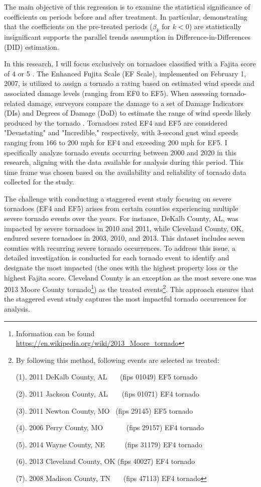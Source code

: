 \documentclass[letterpaper]{article}
\begin{document}
The main objective of this regression is to examine the statistical significance of coefficients on periods before and after treatment. In particular, demonstrating that the coefficients on the pre-treated periods (\( \beta_k \) for \( k < 0 \)) are statistically insignificant supports the parallel trends assumption in Difference-in-Differences (DID) estimation.

In this research, I will focus exclusively on tornadoes classified with a Fajita score of 4 or 5 \parencite{gallagher2023weathering}. The Enhanced Fujita Scale (EF Scale), implemented on February 1, 2007, is utilized to assign a tornado a rating based on estimated wind speeds and associated damage levels (ranging from EF0 to EF5). When assessing tornado-related damage, surveyors compare the damage to a set of Damage Indicators (DIs) and Degrees of Damage (DoD) to estimate the range of wind speeds likely produced by the tornado \parencite[]{NWS}. Tornadoes rated EF4 and EF5 are considered "Devastating" and "Incredible," respectively, with 3-second gust wind speeds ranging from 166 to 200 mph for EF4 and exceeding 200 mph for EF5. I specifically analyze tornado events occurring between 2000 and 2020 in this research, aligning with the data available for analysis during this period. This time frame was chosen based on the availability and reliability of tornado data collected for the study. 

The challenge with conducting a staggered event study focusing on severe tornadoes (EF4 and EF5) arises from certain counties experiencing multiple severe tornado events over the years. For instance, DeKalb County, AL, was impacted by severe tornadoes in 2010 and 2011, while Cleveland County, OK, endured severe tornadoes in 2003, 2010, and 2013. This dataset includes seven counties with recurring severe tornado occurrences. To address this issue, a detailed investigation is conducted for each tornado event to identify and designate the most impacted (the ones with the highest property loss or the highest Fajita score. Cleveland County is an exception as the most severe one was 2013 Moore County tornado\footnote{Information can be found \url{https://en.wikipedia.org/wiki/2013_Moore_tornado}}) as the treated events\footnote{By following this method, following events are selected as treated: 

(1). 2011 DeKalb County, AL \ \ \ (fips 01049) EF5 tornado

(2). 2011 Jackson County, AL\ \ \ \ (fips 01071) EF4 tornado

(3). 2011 Newton County, MO \ (fips 29145) EF5 tornado

(4). 2006 Perry County, MO \ \ \ \ \ \ (fips 29157) EF4 tornado

(5). 2014 Wayne County, NE \ \ \ \ \ (fips 31179) EF4 tornado

(6). 2013 Cleveland County, OK (fips 40027) EF4 tornado

(7). 2008 Madison County, TN \ \ \ (fips 47113) EF4 tornado
}. This approach ensures that the staggered event study captures the most impactful tornado occurrences for analysis.
\end{document}
